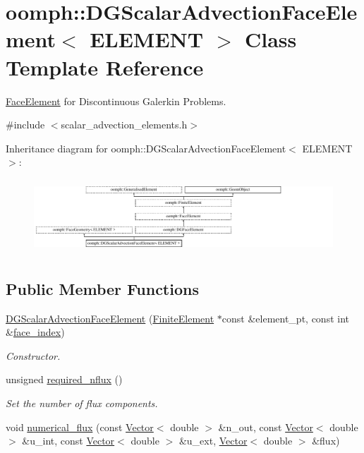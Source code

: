 \hypertarget{classoomph_1_1DGScalarAdvectionFaceElement}{}\section{oomph\+:\+:D\+G\+Scalar\+Advection\+Face\+Element$<$ E\+L\+E\+M\+E\+NT $>$ Class Template Reference}
\label{classoomph_1_1DGScalarAdvectionFaceElement}


\hyperlink{classoomph_1_1FaceElement}{Face\+Element} for Discontinuous Galerkin Problems.  




{\ttfamily \#include $<$scalar\+\_\+advection\+\_\+elements.\+h$>$}

Inheritance diagram for oomph\+:\+:D\+G\+Scalar\+Advection\+Face\+Element$<$ E\+L\+E\+M\+E\+NT $>$\+:\begin{figure}[H]
\begin{center}
\leavevmode
\includegraphics[height=2.828283cm]{classoomph_1_1DGScalarAdvectionFaceElement}
\end{center}
\end{figure}
\subsection*{Public Member Functions}
\begin{DoxyCompactItemize}
\item 
\hyperlink{classoomph_1_1DGScalarAdvectionFaceElement_aa0af0a27203845c9af1ada1cfab13efb}{D\+G\+Scalar\+Advection\+Face\+Element} (\hyperlink{classoomph_1_1FiniteElement}{Finite\+Element} $\ast$const \&element\+\_\+pt, const int \&\hyperlink{classoomph_1_1FaceElement_a478d577ac6db67ecc80f1f02ae3ab170}{face\+\_\+index})
\begin{DoxyCompactList}\small\item\em Constructor. \end{DoxyCompactList}\item 
unsigned \hyperlink{classoomph_1_1DGScalarAdvectionFaceElement_ae3c10d2af6a6aae42ced528040a4d530}{required\+\_\+nflux} ()
\begin{DoxyCompactList}\small\item\em Set the number of flux components. \end{DoxyCompactList}\item 
void \hyperlink{classoomph_1_1DGScalarAdvectionFaceElement_afdbb802744c914451223b5664bb589e4}{numerical\+\_\+flux} (const \hyperlink{classoomph_1_1Vector}{Vector}$<$ double $>$ \&n\+\_\+out, const \hyperlink{classoomph_1_1Vector}{Vector}$<$ double $>$ \&u\+\_\+int, const \hyperlink{classoomph_1_1Vector}{Vector}$<$ double $>$ \&u\+\_\+ext, \hyperlink{classoomph_1_1Vector}{Vector}$<$ double $>$ \&flux)
\end{DoxyCompactItemize}
